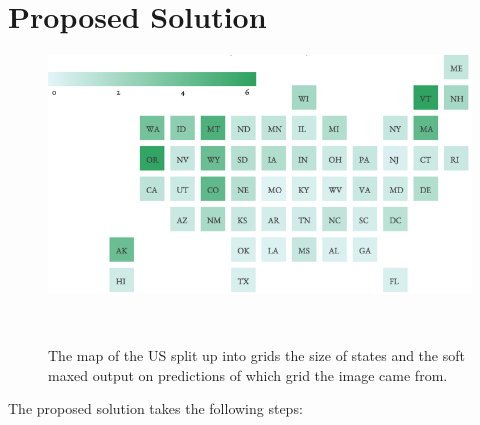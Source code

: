 \documentclass{sigchi}
\begin{document}
 \section{Proposed Solution}
  \begin{figure}
  \centering
  \includegraphics[width=1.00\columnwidth]{figures/mapGrids.png}
  \caption{The map of the US split up into grids the size of states and the soft maxed output on predictions of which grid the image came from.}~\label{fig:figure3}
\end{figure}
 The proposed solution takes the following steps:
\end{document}
